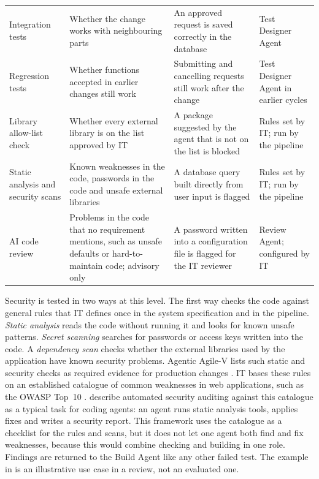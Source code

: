 \documentclass[10pt,a4paper]{article}
\begin{document}
\begin{table}[H]
\begin{tabular}{p{2.5cm} p{4.4cm} p{4.4cm} p{2.3cm}}
    Integration tests & Whether the change works with neighbouring parts &
        An approved request is saved correctly in the database & Test
        Designer Agent \\
    Regression tests & Whether functions accepted in earlier changes still
        work & Submitting and cancelling requests still work after the
        change & Test Designer Agent in earlier cycles \\
    Library allow-list check & Whether every external library is on the
        list approved by IT & A package suggested by the agent that is
        not on the list is blocked & Rules set by IT; run by the
        pipeline \\
    Static analysis and security scans & Known weaknesses in the code,
        passwords in the code and unsafe external libraries & A database
        query built directly from user input is flagged & Rules set by IT;
        run by the pipeline \\
    AI code review & Problems in the code that no requirement mentions,
        such as unsafe defaults or hard-to-maintain code; advisory only &
        A password written into a configuration file is flagged for the
        IT reviewer & Review Agent; configured by IT \\
    \hline
    \end{tabular}
\end{table}

Security is tested in two ways at this level. The
first way checks the code against general rules that IT defines once in the
system specification and in the pipeline. \emph{Static analysis} reads the
code without running it and looks for known unsafe patterns. \emph{Secret
scanning} searches for passwords or access keys written into the code. A
\emph{dependency scan} checks whether the external libraries used by the
application have known security problems. Agentic Agile-V lists such static
and security checks as required evidence for production changes
\parencite{koch2026agentic}. IT bases these rules on an established catalogue of common weaknesses in
web applications, such as the OWASP Top~10 \parencite{TODO-owasptop10}.
\textcite{sapkota2025} describe automated security auditing against this
catalogue as a typical task for coding agents: an agent runs static
analysis tools, applies fixes and writes a security report. This framework
uses the catalogue as a checklist for the rules and scans, but it does not
let one agent both find and fix weaknesses, because this would combine
checking and building in one role. Findings are returned to the Build
Agent like any other failed test. The example in \textcite{sapkota2025} is
an illustrative use case in a review, not an evaluated one.
\end{document}
